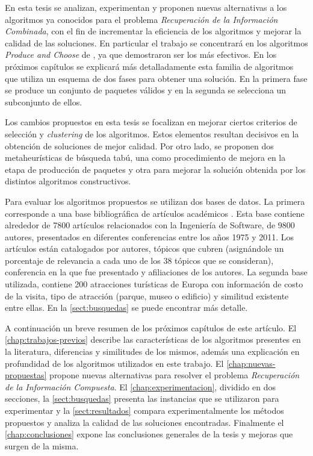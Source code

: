 En esta tesis se analizan, experimentan y proponen nuevas alternativas a los algoritmos ya conocidos para el problema {\em Recuperación de la Información Combinada}, con el fin de incrementar la eficiencia de los algoritmos y mejorar la calidad de las soluciones. En particular el trabajo se concentrará en los algoritmos {\em Produce and Choose} de \cite{journals/tkde/Amer-YahiaBCFMZ14}, ya que demostraron ser los más efectivos. En los próximos capítulos se explicará más detalladamente esta familia de algoritmos que utiliza un esquema de dos fases para obtener una solución. En la primera fase se produce un conjunto de paquetes válidos y en la segunda se selecciona un subconjunto de ellos.

Los cambios propuestos en esta tesis se focalizan en mejorar ciertos criterios de selección y {\em clustering} de los algoritmos. Estos elementos resultan decisivos en la obtención de soluciones de mejor calidad. Por otro lado, se proponen dos metaheurísticas de búsqueda tabú, una como procedimiento de mejora en la etapa de producción de paquetes y otra para mejorar la solución obtenida por los distintos algoritmos constructivos.

Para evaluar los algoritmos propuestos se utilizan dos bases de datos. La primera corresponde a una base bibliográfica de artículos académicos \cite{dataDrive}. Esta base contiene alrededor de 7800 artículos relacionados con la Ingeniería de Software, de 9800 autores, presentados en diferentes conferencias entre los años 1975 y 2011. Los artículos están catalogados por autores, tópicos que cubren (asignándole un porcentaje de relevancia a cada uno de los 38 tópicos que se consideran), conferencia en la que fue presentado y afiliaciones de los autores. La segunda base utilizada, contiene 200 atracciones turísticas de Europa con información de costo de la visita, tipo de atracción (parque, museo o edificio) y similitud existente entre ellas. En la \autoref{sect:busquedas} se puede encontrar más detalle.

A continuación un breve resumen de los próximos capítulos de este artículo. El \autoref{chap:trabajos-previos} describe las características de los algoritmos presentes en la literatura, diferencias y similitudes de los mismos, además una explicación en profundidad de los algoritmos utilizados en este trabajo. El \autoref{chap:nuevas-propuestas} propone nuevas alternativas para resolver el problema {\em Recuperación de la Información Compuesta}. El \autoref{chap:experimentacion}, dividido en dos secciones, la \autoref{sect:busquedas} presenta las instancias que se utilizaron para experimentar y la \autoref{sect:resultados} compara experimentalmente los métodos propuestos y analiza la calidad de las soluciones encontradas. Finalmente el \autoref{chap:conclusiones} expone las conclusiones generales de la tesis y mejoras que surgen de la misma.
